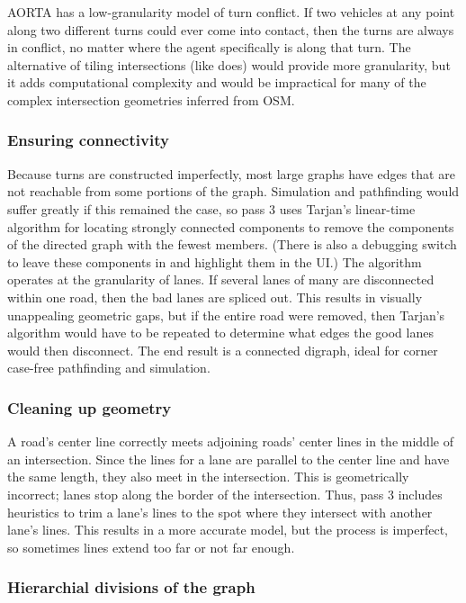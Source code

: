\documentclass[letterpaper, 10 pt, conference]{ieeeconf}  %
\begin{document}
{

AORTA has a low-granularity model of turn conflict. If two vehicles at any point
along two different turns could ever come into contact, then the turns are
always in conflict, no matter where the agent specifically is along that turn.
The alternative of tiling intersections (like \cite{JAIR08-dresner} does) would
provide more granularity, but it adds computational complexity and would be
impractical for many of the complex intersection geometries inferred from OSM.

\subsubsection{Ensuring connectivity}

Because turns are constructed imperfectly, most large graphs have edges that are
not reachable from some portions of the graph. Simulation and pathfinding would
suffer greatly if this remained the case, so pass 3 uses Tarjan's linear-time
algorithm for locating strongly connected components to remove the components of
the directed graph with the fewest members. (There is also a debugging switch to
leave these components in and highlight them in the UI.) The algorithm operates
at the granularity of lanes. If several lanes of many are disconnected within
one road, then the bad lanes are spliced out. This results in visually
unappealing geometric gaps, but if the entire road were removed, then Tarjan's
algorithm would have to be repeated to determine what edges the good lanes would
then disconnect. The end result is a connected digraph, ideal for corner
case-free pathfinding and simulation.

\subsubsection{Cleaning up geometry}

A road's center line correctly meets adjoining roads' center lines in the middle
of an intersection. Since the lines for a lane are parallel to the center line
and have the same length, they also meet in the intersection. This is
geometrically incorrect; lanes stop along the border of the intersection. Thus,
pass 3 includes heuristics to trim a lane's lines to the spot where they
intersect with another lane's lines. This results in a more accurate model, but
the process is imperfect, so sometimes lines extend too far or not far enough.

\subsubsection{Hierarchial divisions of the graph}

}
\end{document}
